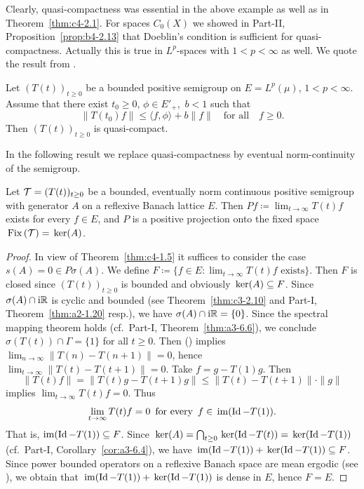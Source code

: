 Clearly, quasi-compactness was essential in the above example as well as in Theorem~\ref{thm:c4-2.1}.
For spaces $C_{0}(X)$ we showed in 
Part-II, Proposition~\ref{prop:b4-2.13} 
that Doeblin's condition is sufficient for quasi-compactness.
Actually this is true in $L^{p}$-spaces with $1 < p < \infty$ as well.
We quote the result from \textcite{lotz:1986}.
\begin{proposition}\label{prop:c4-2.4}
%
%
Let $(T(t))_{t \geq 0}$ be a bounded positive semigroup on $E = L^{p}(\mu)$, $1 < p < \infty$.
Assume that there exist $t_{0} \geq 0$, $\phi \in E'_{+}$,\, $b < 1$ such that
\begin{equation}\label{eq:c4-2.4}
\|T(t_{0})f\| \leq \langle f,\phi \rangle + b\|f\| \quad \text{for all} \quad f \geq 0.
\end{equation}
Then $(T(t))_{t \geq 0}$ is quasi-compact.
\end{proposition}
In the following result we replace quasi-compactness by eventual norm-continuity of the semigroup.
\begin{theorem} \label{thm:c4-2.5}
%
Let $\TT = (T(t))_{t \geq 0}$ be a bounded, eventually norm continuous positive semigroup with generator $A$ on a reflexive Banach lattice $E$.
Then $Pf \coloneq  \lim_{t \to \infty} T(t)f$ exists for every $f \in E$, and
$P$ is a positive projection onto the fixed space $\mathop{}\mathrm{Fix}\left(\mathcal{T}\right) = \mathop{}\mathrm{ker}(A)$. 
\end{theorem}
\begin{proof}
In view of Theorem~\ref{thm:c4-1.5} it suffices to consider the case $s(A) = 0 \in P{\sigma}(A)$.
We define $F \coloneq \{f \in E \colon \lim_{t \to \infty} T(t)f \text{ exists}\}$.
Then $F$ is closed since $(T(t))_{t \geq 0}$ is bounded and obviously $\mathop{}\mathrm{ker}(A) \subseteq F$.
Since $\sigma(A) \cap \mathrm{i}\mathbb{R}$ is cyclic and bounded (see Theorem~\ref{thm:c3-2.10} and Part-I, Theorem~\ref{thm:a2-1.20} resp.), we have $\sigma(A) \cap \mathrm{i}\mathbb{R} = \{0\}$.
Since the spectral mapping theorem holds (cf.\ Part-I, Theorem~\ref{thm:a3-6.6}), we conclude $\sigma(T(t)) \cap \Gamma = \{1\}$ for all $t \geq 0$.
Then () implies $\lim_{n \to \infty} \|T(n) - T(n+1)\| = 0$, hence $\lim_{t \to \infty}\|T(t) - T(t+1)\| = 0$.
Take $f = g - T(1)g$.
Then 
%
\[
	\|T(t)f\| = \|T(t)g - T(t+1)g\| \leq \|T(t) - T(t+1)\| \cdot \|g\|
\]
%
implies $\lim_{t \to \infty} T(t)f = 0$.
Thus
\begin{equation}\label{eq:c4-2.5}
\lim_{t \to \infty} T(t)f = 0\, \text{ for every }\, f \in \mathop{}\mathrm{im}(\operatorname{Id} - T(1)).
\end{equation}
That is, $\mathrm{im}(\operatorname{Id} - T(1)) \subseteq F$.
Since $\Kern{A} = \bigcap_{t \geq 0} \Kern{\Id - T(t)} = \Kern{\Id - T(1)}$ (cf.\ Part-I, Corollary~\ref{cor:a3-6.4}), we have $\mathop{}\mathrm{im}(\operatorname{Id} - T(1)) + \mathop{}\mathrm{ker}(\operatorname{Id} - T(1)) \subseteq F$.
Since power bounded operators on a reflexive Banach space are mean ergodic (\eg  see \textcite[Chapter~2, Theorem~1.2]{krengel:1985}), we obtain that $\mathop{}\mathrm{im}(\operatorname{Id} - T(1)) + \mathop{}\mathrm{ker}(\operatorname{Id} - T(1))$ is dense in $E$, hence $F = E$.
\end{proof}
